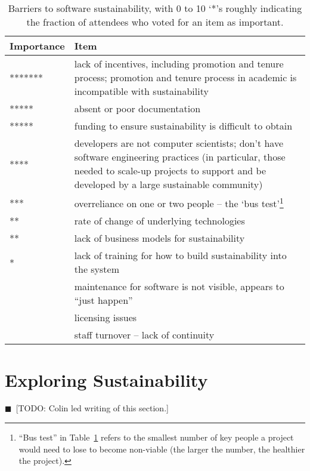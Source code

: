 \documentclass[11pt, oneside]{amsart}
\newcommand{\todo}[1]{{\color{blue}$\blacksquare$~\textsf{[TODO: #1]}}}
\begin{document}
\begin{table}[ht]
\caption{Barriers to software sustainability, with 0 to 10 `*'s roughly
indicating the fraction of attendees who voted for an item as important.}
\label{tb:software_sustainability_barriers}
 \centering
  \begin{scriptsize}
  \begin{tabular}{ | p{1.65cm} | p{10.0cm} |}
   \hline
  Importance & Item \\ \hline \hline
******* & lack of incentives, including promotion and tenure process; promotion
and tenure process in academic is incompatible with sustainability \\ \hline
*****  & absent or poor documentation \\ \hline
***** & funding to ensure sustainability is difficult to obtain \\ \hline
**** & developers are not computer scientists; don't have software engineering
practices (in particular, those needed to scale-up projects to support and be
developed by a large sustainable community) \\ \hline
*** & overreliance on one or two people -- the `bus test'\footnote{``Bus test''
in Table~\ref{tb:software_sustainability_barriers} refers to the smallest number
of key people a project would need to lose to become non-viable (the larger the
number, the healthier the project).} \\ \hline
** & rate of change of underlying technologies \\ \hline
** & lack of business models for sustainability \\ \hline
* & lack of training for how to build sustainability into the system \\ \hline
 & maintenance for software is not visible, appears to ``just happen'' \\ \hline
 & licensing issues \\ \hline
 & staff turnover -- lack of continuity \\ \hline
\end{tabular}
 \end{scriptsize}
\end{table}

\section{Exploring Sustainability} \label{sec:exploring}
\todo{Colin led writing of this section.}
\end{document}
